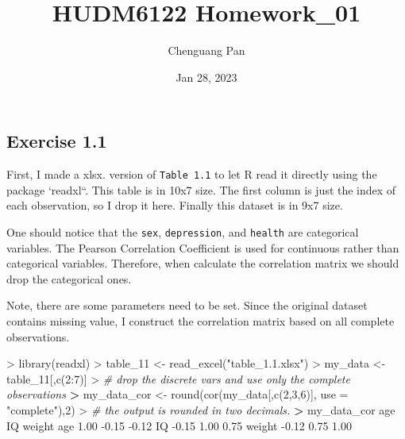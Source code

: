 \documentclass[
]{article}
\title{HUDM6122 Homework\_01}
\author{Chenguang Pan}
\date{Jan 28, 2023}
\newenvironment{Shaded}{\begin{snugshade}}{\end{snugshade}}
\newcommand{\AttributeTok}[1]{\textcolor[rgb]{0.77,0.63,0.00}{#1}}
\newcommand{\CommentTok}[1]{\textcolor[rgb]{0.56,0.35,0.01}{\textit{#1}}}
\newcommand{\DecValTok}[1]{\textcolor[rgb]{0.00,0.00,0.81}{#1}}
\newcommand{\ErrorTok}[1]{\textcolor[rgb]{0.64,0.00,0.00}{\textbf{#1}}}
\newcommand{\FloatTok}[1]{\textcolor[rgb]{0.00,0.00,0.81}{#1}}
\newcommand{\FunctionTok}[1]{\textcolor[rgb]{0.00,0.00,0.00}{#1}}
\newcommand{\NormalTok}[1]{#1}
\newcommand{\OtherTok}[1]{\textcolor[rgb]{0.56,0.35,0.01}{#1}}
\newcommand{\SpecialCharTok}[1]{\textcolor[rgb]{0.00,0.00,0.00}{#1}}
\newcommand{\StringTok}[1]{\textcolor[rgb]{0.31,0.60,0.02}{#1}}
\begin{document}
\maketitle

\hypertarget{exercise-1.1}{%
\subsection{Exercise 1.1}\label{exercise-1.1}}

First, I made a xlsx. version of \texttt{Table\ 1.1} to let R read it
directly using the package `readxl``. This table is in 10x7 size. The
first column is just the index of each observation, so I drop it here.
Finally this dataset is in 9x7 size.

One should notice that the \texttt{sex}, \texttt{depression}, and
\texttt{health} are categorical variables. The Pearson Correlation
Coefficient is used for continuous rather than categorical variables.
Therefore, when calculate the correlation matrix we should drop the
categorical ones.

Note, there are some parameters need to be set. Since the original
dataset contains missing value, I construct the correlation matrix based
on all complete observations.

\begin{Shaded}
\begin{Highlighting}[]
\SpecialCharTok{\textgreater{}} \FunctionTok{library}\NormalTok{(readxl)}
\SpecialCharTok{\textgreater{}}\NormalTok{ table\_11 }\OtherTok{\textless{}{-}} \FunctionTok{read\_excel}\NormalTok{(}\StringTok{"table\_1.1.xlsx"}\NormalTok{)}
\SpecialCharTok{\textgreater{}}\NormalTok{ my\_data }\OtherTok{\textless{}{-}}\NormalTok{ table\_11[,}\FunctionTok{c}\NormalTok{(}\DecValTok{2}\SpecialCharTok{:}\DecValTok{7}\NormalTok{)]}
\SpecialCharTok{\textgreater{}} \CommentTok{\# drop the discrete vars and use only the complete observations}
\ErrorTok{\textgreater{}}\NormalTok{ my\_data\_cor }\OtherTok{\textless{}{-}} \FunctionTok{round}\NormalTok{(}\FunctionTok{cor}\NormalTok{(my\_data[,}\FunctionTok{c}\NormalTok{(}\DecValTok{2}\NormalTok{,}\DecValTok{3}\NormalTok{,}\DecValTok{6}\NormalTok{)], }\AttributeTok{use =} \StringTok{"complete"}\NormalTok{),}\DecValTok{2}\NormalTok{)}
\SpecialCharTok{\textgreater{}} \CommentTok{\# the output is rounded in two decimals.}
\ErrorTok{\textgreater{}}\NormalTok{ my\_data\_cor}
\NormalTok{         age    IQ weight}
\NormalTok{age     }\FloatTok{1.00} \SpecialCharTok{{-}}\FloatTok{0.15}  \SpecialCharTok{{-}}\FloatTok{0.12}
\NormalTok{IQ     }\SpecialCharTok{{-}}\FloatTok{0.15}  \FloatTok{1.00}   \FloatTok{0.75}
\NormalTok{weight }\SpecialCharTok{{-}}\FloatTok{0.12}  \FloatTok{0.75}   \FloatTok{1.00}
\end{Highlighting}
\end{Shaded}
\end{document}
